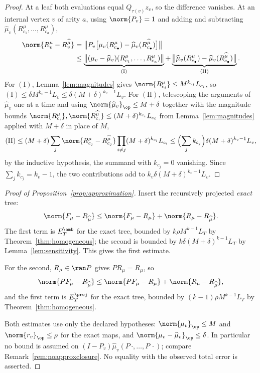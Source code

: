\begin{proof}
At a leaf both evaluations equal $Q_{\tau(v)}z_v$, so the difference vanishes. At an
internal vertex $v$ of arity $a$, using $\norm{P_v}=1$ and adding and subtracting
$\widehat\mu_v(R^{\mu}_{c_1},\ldots,R^{\mu}_{c_a})$,
\begin{align*}
 \norm{R^{\mu}_v-R^{\widehat\mu}_v}
 &=\bigl\lVert P_v\bigl[\mu_v(R^{\mu}_{c_\bullet})-\widehat\mu_v(R^{\widehat\mu}_{c_\bullet})\bigr]\bigr\rVert\\
 &\le\underbrace{\bigl\lVert(\mu_v-\widehat\mu_v)(R^{\mu}_{c_1},\ldots,R^{\mu}_{c_a})\bigr\rVert}_{(\mathrm I)}
 +\underbrace{\bigl\lVert\widehat\mu_v(R^{\mu}_{c_\bullet})-\widehat\mu_v(R^{\widehat\mu}_{c_\bullet})\bigr\rVert}_{(\mathrm{II})}.
\end{align*}
For $(\mathrm I)$, Lemma~\ref{lem:magnitudes} gives
$\norm{R^{\mu}_{c_i}}\le M^{k_{c_i}}L_{c_i}$, so
$(\mathrm I)\le\delta M^{k_v-1}L_v\le\delta(M+\delta)^{k_v-1}L_v$.
For $(\mathrm{II})$, telescoping the arguments of $\widehat\mu_v$ one at a time and using
$\norm{\widehat\mu_v}_\op\le M+\delta$ together with the magnitude bounds
$\norm{R^{\mu}_{c_i}},\norm{R^{\widehat\mu}_{c_i}}\le(M+\delta)^{k_{c_i}}L_{c_i}$ from
Lemma~\ref{lem:magnitudes} applied with $M+\delta$ in place of $M$,
\[
 (\mathrm{II})
 \le(M+\delta)\sum_{j}\norm{R^{\mu}_{c_j}-R^{\widehat\mu}_{c_j}}
 \prod_{i\ne j}(M+\delta)^{k_{c_i}}L_{c_i}
 \le\Bigl(\sum_jk_{c_j}\Bigr)\delta(M+\delta)^{k_v-1}L_v,
\]
by the inductive hypothesis, the summand with $k_{c_j}=0$ vanishing. Since
$\sum_jk_{c_j}=k_v-1$, the two contributions add to $k_v\delta(M+\delta)^{k_v-1}L_v$.
\end{proof}

\begin{proof}[Proof of Proposition~\ref{prop:approximation}]
Insert the recursively projected \emph{exact} tree:
\[
 \norm{F_\mu-R_{\widehat\mu}}
 \le\norm{F_\mu-R_\mu}+\norm{R_\mu-R_{\widehat\mu}}.
\]
The first term is $E_T^{\amb}$ for the exact tree, bounded by $k\rho M^{k-1}L_T$ by
Theorem~\ref{thm:homogeneous}; the second is bounded by $k\delta(M+\delta)^{k-1}L_T$ by
Lemma~\ref{lem:sensitivity}. This gives the first estimate.

For the second, $R_\mu\in\ran P$ gives $PR_\mu=R_\mu$, so
\[
 \norm{PF_\mu-R_{\widehat\mu}}
 \le\norm{PF_\mu-R_\mu}+\norm{R_\mu-R_{\widehat\mu}},
\]
and the first term is $E_T^{\proj}$ for the exact tree, bounded by
$(k-1)\rho M^{k-1}L_T$ by Theorem~\ref{thm:homogeneous}.

Both estimates use only the declared hypotheses: $\norm{\mu_v}_\op\le M$ and
$\norm{r_v}_\op\le\rho$ for the exact maps, and $\norm{\mu_v-\widehat\mu_v}_\op\le\delta$.
In particular no bound is assumed on
$(I-P_v)\widehat\mu_v(P\,\cdot,\ldots,P\,\cdot)$; compare
Remark~\ref{rem:noapproxclosure}. No equality with the observed total error is asserted.
\end{proof}
